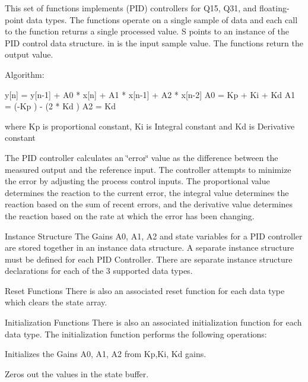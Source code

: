 This set of functions implements (P\+ID) controllers for Q15, Q31, and floating-\/point data types. The functions operate on a single sample of data and each call to the function returns a single processed value. {\ttfamily S} points to an instance of the P\+ID control data structure. {\ttfamily in} is the input sample value. The functions return the output value.

\begin{DoxyParagraph}{Algorithm\+:}

\begin{DoxyPre}
   y[n] = y[n-1] + A0 * x[n] + A1 * x[n-1] + A2 * x[n-2]
   A0 = Kp + Ki + Kd
   A1 = (-Kp ) - (2 * Kd )
   A2 = Kd
\end{DoxyPre}

\end{DoxyParagraph}
\begin{DoxyParagraph}{}
where {\ttfamily Kp} is proportional constant, {\ttfamily Ki} is Integral constant and {\ttfamily Kd} is Derivative constant
\end{DoxyParagraph}
\begin{DoxyParagraph}{}
 
\end{DoxyParagraph}
\begin{DoxyParagraph}{}
The P\+ID controller calculates an \char`\"{}error\char`\"{} value as the difference between the measured output and the reference input. The controller attempts to minimize the error by adjusting the process control inputs. The proportional value determines the reaction to the current error, the integral value determines the reaction based on the sum of recent errors, and the derivative value determines the reaction based on the rate at which the error has been changing.
\end{DoxyParagraph}
\begin{DoxyParagraph}{Instance Structure}
The Gains A0, A1, A2 and state variables for a P\+ID controller are stored together in an instance data structure. A separate instance structure must be defined for each P\+ID Controller. There are separate instance structure declarations for each of the 3 supported data types.
\end{DoxyParagraph}
\begin{DoxyParagraph}{Reset Functions}
There is also an associated reset function for each data type which clears the state array.
\end{DoxyParagraph}
\begin{DoxyParagraph}{Initialization Functions}
There is also an associated initialization function for each data type. The initialization function performs the following operations\+:
\begin{DoxyItemize}
\item Initializes the Gains A0, A1, A2 from Kp,Ki, Kd gains.
\item Zeros out the values in the state buffer.
\end{DoxyItemize}
\end{DoxyParagraph}

